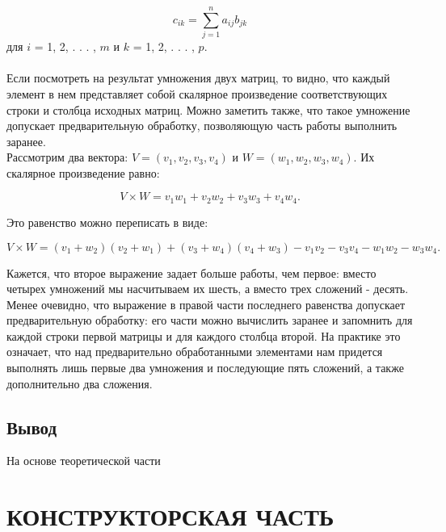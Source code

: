 \documentclass[a4paper,12pt]{article}
\begin{document}
\begin{equation}
c_{ik} = \sum \limits_{j=1}^{n} a_{ij}b_{jk}
\end{equation}
для $i$ = 1, 2, . . . , $m$ и $k$ = 1, 2, . . . , $p$. \\
\\
Если посмотреть на результат умножения двух матриц, то видно, что каждый элемент в нем представляет собой скалярное произведение соответствующих строки и столбца исходных матриц. Можно заметить также, что такое умножение допускает предварительную обработку, позволяющую часть работы выполнить заранее. \\
Рассмотрим два вектора: $V = (v_1, v_2, v_3, v_4)$ и $W = (w_1, w_2, w_3, w_4)$. Их скалярное произведение равно:
\begin{center}
\begin{equation}
V × W = v_1w_1 + v_2w_2 + v_3w_3 + v_4w_4.
\end{equation}
\end{center}
Это равенство можно переписать в виде:
\begin{center}
\begin{equation}
V × W = (v_1 + w_2)(v_2 + w_1) + (v_3 + w_4)(v_4 + w_3) - v_1v_2 - v_3v_4 - w_1w_2 - w_3w_4.
\end{equation}
\end{center}
Кажется, что второе выражение задает больше работы, чем первое: вместо четырех умножений мы насчитываем их шесть, а вместо трех сложений - десять. Менее очевидно, что выражение в правой части последнего равенства допускает предварительную обработку: его части можно вычислить заранее и запомнить для каждой строки первой матрицы и для каждого столбца второй. На практике это означает, что над предварительно обработанными элементами нам придется выполнять лишь первые два умножения и последующие пять сложений, а также дополнительно два сложения. 

\newpage
\subsection{Вывод}
На основе теоретической части 


\newpage
\section{КОНСТРУКТОРСКАЯ ЧАСТЬ}
\end{document}
